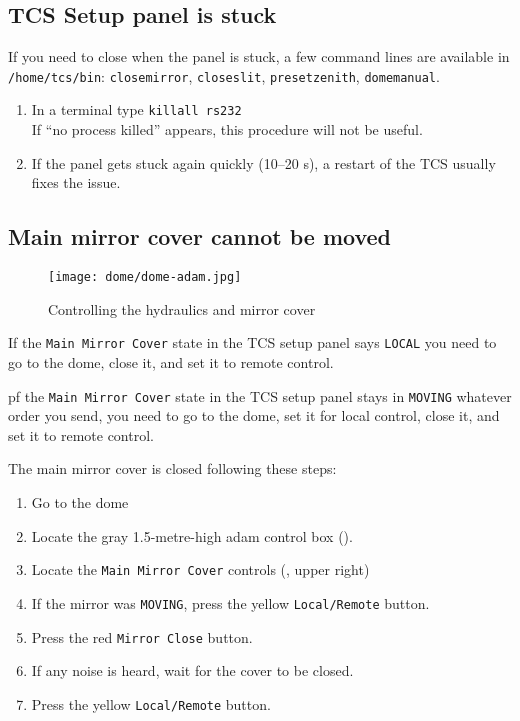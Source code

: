 \documentclass[11pt,fleqn,a4paper]{book}
\begin{document}
\subsection{TCS Setup panel is stuck}

If you need to close when the panel is stuck, a few command lines are available in \texttt{/home/tcs/bin}: \texttt{closemirror}, \texttt{closeslit}, \texttt{presetzenith}, \texttt{domemanual}. 

\label{proc:unstuckTCSpanel}
\begin{enumerate}
  \item In a terminal type \texttt{killall rs232}\\
        If ``no process killed'' appears, this procedure will not be useful.
  \item If the panel gets stuck again quickly (10--20 s), a restart of the TCS usually fixes the issue. 
\end{enumerate}

\subsection{Main mirror cover cannot be moved}
\begin{figure}
\centering
\texttt{[image: dome/dome-adam.jpg]}
\caption{Controlling the hydraulics and mirror cover}
\label{fig:dome-adam}
\end{figure}

If the \texttt{Main Mirror Cover} state in the \gls{TCS setup panel} says
\texttt{LOCAL} you need to go to the dome, close it, and set it
to remote control.

pf the \texttt{Main Mirror Cover} state in the \gls{TCS setup panel} stays in
\texttt{MOVING} whatever order you send, you need to go to the dome, set it for local control, close it, and set it to remote control.
 

\label{proc:mainmirrorstuck}
The \gls{main mirror} cover is closed following these steps:
\begin{enumerate}
   \item Go to the \gls{dome}
   \item Locate the gray 1.5-metre-high \gls{adam} control box ().
   \item Locate the \texttt{Main Mirror Cover} controls (, upper right) 
   \item If the mirror was \texttt{MOVING}, press the yellow \texttt{Local/Remote} button.
   \item Press the red \texttt{Mirror Close} button.
   \item If any noise is heard, wait for the cover to be closed.
   \item Press the yellow \texttt{Local/Remote} button.
\end{enumerate} 
\end{document}
